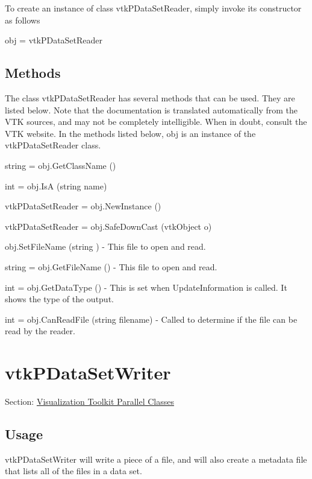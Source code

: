 To create an instance of class vtk\-P\-Data\-Set\-Reader, simply invoke its constructor as follows \begin{DoxyVerb}  obj = vtkPDataSetReader
\end{DoxyVerb}
 \hypertarget{vtkwidgets_vtkxyplotwidget_Methods}{}\subsection{Methods}\label{vtkwidgets_vtkxyplotwidget_Methods}
The class vtk\-P\-Data\-Set\-Reader has several methods that can be used. They are listed below. Note that the documentation is translated automatically from the V\-T\-K sources, and may not be completely intelligible. When in doubt, consult the V\-T\-K website. In the methods listed below, {\ttfamily obj} is an instance of the vtk\-P\-Data\-Set\-Reader class. 
\begin{DoxyItemize}
\item {\ttfamily string = obj.\-Get\-Class\-Name ()}  
\item {\ttfamily int = obj.\-Is\-A (string name)}  
\item {\ttfamily vtk\-P\-Data\-Set\-Reader = obj.\-New\-Instance ()}  
\item {\ttfamily vtk\-P\-Data\-Set\-Reader = obj.\-Safe\-Down\-Cast (vtk\-Object o)}  
\item {\ttfamily obj.\-Set\-File\-Name (string )} -\/ This file to open and read.  
\item {\ttfamily string = obj.\-Get\-File\-Name ()} -\/ This file to open and read.  
\item {\ttfamily int = obj.\-Get\-Data\-Type ()} -\/ This is set when Update\-Information is called. It shows the type of the output.  
\item {\ttfamily int = obj.\-Can\-Read\-File (string filename)} -\/ Called to determine if the file can be read by the reader.  
\end{DoxyItemize}\hypertarget{vtkparallel_vtkpdatasetwriter}{}\section{vtk\-P\-Data\-Set\-Writer}\label{vtkparallel_vtkpdatasetwriter}
Section\-: \hyperlink{sec_vtkparallel}{Visualization Toolkit Parallel Classes} \hypertarget{vtkwidgets_vtkxyplotwidget_Usage}{}\subsection{Usage}\label{vtkwidgets_vtkxyplotwidget_Usage}
vtk\-P\-Data\-Set\-Writer will write a piece of a file, and will also create a metadata file that lists all of the files in a data set.

